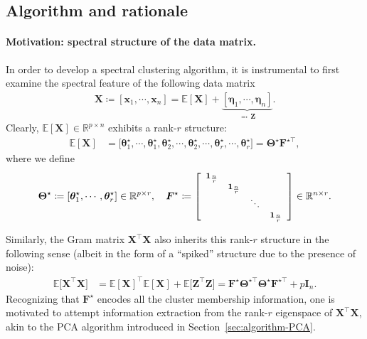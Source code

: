\subsection{Algorithm and rationale}
\label{sec:algorithm-gaussian-mixture}


\paragraph{Motivation: spectral structure of the data matrix.}

In order to develop a spectral clustering algorithm, it is instrumental to first examine the spectral feature of the following data matrix
%
\begin{align}
	\bm{X}\coloneqq[\bm{x}_{1},\cdots,\bm{x}_{n}]=\mathbb{E}[\bm{X}]+\underset{\eqqcolon\,\bm{Z}}{\underbrace{[\bm{\eta}_{1},\cdots,\bm{\eta}_{n}]}}.
	\label{eq:defn-Z-X-EX-GMM}
\end{align}
%
Clearly, $\mathbb{E}[\bm{X}] \in \mathbb{R}^{p \times n}$ exhibits a rank-$r$ structure:
%
\begin{align*}
	\mathbb{E}[\bm{X}] & =\big[\bm{\theta}_{1}^{\star},\cdots,\bm{\theta}_{1}^{\star},\bm{\theta}_{2}^{\star},\cdots,\bm{\theta}_{2}^{\star},\cdots,\bm{\theta}_{r}^{\star},\cdots,\bm{\theta}_{r}^{\star}\big]
 	= \bm{\Theta}^{\star}\bm{F}^{\star\top},
\end{align*}
%
where we define
%
\begin{align}
\bm{\Theta}^{\star}\coloneqq\left[\bm{\theta}_{1}^{\star},\cdots,\bm{\theta}_{r}^{\star}\right] \in \mathbb{R}^{p\times r},
\quad
\bm{F}^{\star}\coloneqq {\footnotesize\left[\begin{array}{cccc}
\bm{1}_{\frac{n}{r}}\\
 & \bm{1}_{\frac{n}{r}}\\
 &  & \ddots\\
 &  &  & \bm{1}_{\frac{n}{r}}
\end{array}\right] }\in \mathbb{R}^{n\times r}.
\label{eq:defn-Theta-star-F-star-GMM}
\end{align}
%


Similarly, the Gram matrix $\bm{X}^{\top}\bm{X}$ also inherits this rank-$r$ structure in the following sense (albeit in the form of a ``spiked'' structure due to the presence of noise):
%
\begin{align}
	\mathbb{E}\big[\bm{X}^{\top}\bm{X}\big]
	& =\mathbb{E}[\bm{X}]^{\top}\mathbb{E}[\bm{X}]+\mathbb{E}\big[\bm{Z}^{\top}\bm{Z}\big]
	=\bm{F}^{\star}\bm{\Theta}^{\star\top}\bm{\Theta}^{\star}\bm{F}^{\star\top}+p\bm{I}_n .
	\label{eq:mean-XT-X-GM}
\end{align}
%
Recognizing that  $\bm{F}^{\star}$ encodes all the cluster membership information,
one is motivated to attempt information extraction from the rank-$r$ eigenspace of $\bm{X}^{\top}\bm{X}$,
akin to the PCA algorithm introduced in Section~\ref{sec:algorithm-PCA}.



